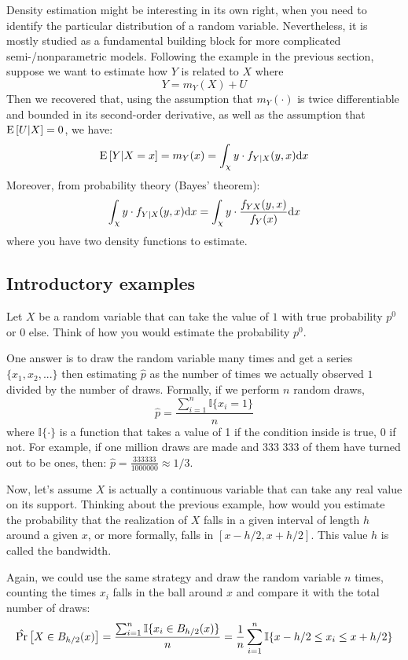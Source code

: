 Density estimation might be interesting in its own right, when you need to identify the particular distribution of a random variable. Nevertheless, it is mostly studied as a fundamental building block for more complicated semi-/nonparametric models. Following the example in the previous section, suppose we want to estimate how $Y$ is related to $X$ where $$ Y = m_Y(X) + U $$ Then we recovered that, using the assumption that $m_Y(\cdot)$ is twice differentiable and bounded in its second-order derivative, as well as the assumption that $\operatorname{E}\left[U\vert X\right] = 0$, we have: $$\operatorname{E}\left[Y\vert X = x\right] = m_Y(x) = \int_\chi y\cdot f_{Y\vert X}(y, x)\mathrm{d} x $$ Moreover, from probability theory (Bayes' theorem): $$ \int_\chi y\cdot f_{Y\vert X}(y, x)\mathrm{d} x = \int_\chi y\cdot \frac{f_{YX}(y, x)}{f_{Y}(x)} \mathrm{d} x$$ where you have two density functions to estimate.

\subsection{Introductory examples}

Let $X$ be a random variable that can take the value of $1$ with true probability $p^0$ or $0$ else. Think of how you would estimate the probability $p^0$.

One answer is to draw the random variable many times and get a series $\{ x_1, x_2, ...\}$ then estimating $\hat p$ as the number of times we actually observed $1$ divided by the number of draws. Formally, if we perform $n$ random draws, $$\hat p = \frac{\sum_{i=1}^{n} \mathbb{I}\{x_i = 1\} }{n} $$ where $\mathbb{I}\{\cdot\}$ is a function that takes a value of 1 if the condition inside is true, 0 if not. For example, if one million draws are made and 333 333 of them have turned out to be ones, then: $\hat p = \frac{ 333333 }{1000000}\approx 1/3 $.

Now, let's assume $X$ is actually a continuous variable that can take any real value on its support. Thinking about the previous example, how would you estimate the probability that the realization of $X$ falls in a given interval of length $h$ around a given $x$, or more formally, falls in $[x - h/2, x+ h/2]$. This value $h$ is called the bandwidth.

Again, we could use the same strategy and draw the random variable $n$ times, counting the times $x_i$ falls in the ball around $x$ and compare it with the total number of draws: $$ \hat{\operatorname{Pr}}\left[ X\in B_{h/2}(x) \right] = \frac{\sum_{i=1}^{n} \mathbb{I}\{ x_i \in B_{h/2}(x)\} }{n} = \frac{1}{n} \sum_{i=1}^{n} \mathbb{I}\{ x - h/2 \leq x_i \leq x + h/2 \} $$

